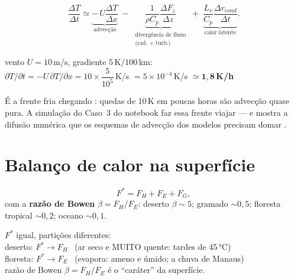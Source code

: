 \documentclass[11pt]{article}
\begin{document}
\begin{formalivro}
\[ \frac{\Delta T}{\Delta t} \simeq
 \underbrace{-\,U\frac{\Delta T}{\Delta x}}_{\text{advecção}}
 \;-\; \underbrace{\frac{1}{\rho C_p}\frac{\Delta F_z}{\Delta z}}_{\substack{\text{divergência de fluxo}\\ \text{(rad.\ + turb.)}}}
 \;+\; \underbrace{\frac{L_v}{C_p}\frac{\Delta r_{cond}}{\Delta t}}_{\text{calor latente}}. \]
\end{formalivro}

\begin{noquadro}
vento $U = 10$\,m/s, gradiente $5$\,K$/100$\,km:\\[2pt]
$\partial T/\partial t = -U\,\partial T/\partial x
 = 10\times\dfrac{5}{10^5}$\,K/s $= 5\times10^{-4}$\,K/s
 $\simeq \mathbf{1{,}8}$\,\textbf{K/h}
\end{noquadro}

É a frente fria chegando : quedas de 10\,K em poucas
horas são advecção quase pura. A simulação do Caso~3 do notebook faz essa
frente viajar — e mostra a difusão numérica que os esquemas de advecção
dos modelos precisam domar .

\section{Balanço de calor na superfície}\label{sec:superficie}


\begin{formalivro}[Stull eq.~3.52]
\[ F^{*} = F_H + F_E + F_G, \]
com a \textbf{razão de Bowen} $\beta = F_H/F_E$: deserto $\beta\sim5$;
gramado $\sim0{,}5$; floresta tropical $\sim0{,}2$; oceano $\sim0{,}1$.
\end{formalivro}

\begin{noquadro}
$F^*$ igual, partições diferentes:\\
deserto: $F^* \to F_H$ \ (ar seco e MUITO quente: tardes de 45\,°C)\\
floresta: $F^* \to F_E$ \ (evapora: ameno e úmido; a chuva de Manaus)\\[2pt]
razão de Bowen $\beta = F_H/F_E$ é o ``caráter'' da superfície.
\end{noquadro}
\end{document}
